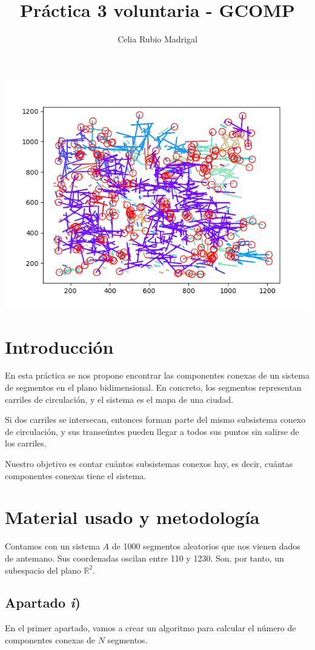 \documentclass[a4paper]{article}
\author{Celia Rubio Madrigal}
\title{Práctica 3 voluntaria - GCOMP}
\begin{document}
	\maketitle
	
	\tableofcontents
	
	\vfill
	
	\begin{center}
		\includegraphics[width=0.7\linewidth]{3}
	\end{center}
	
	
	\vfill
	\newpage
	
	\section{Introducción}
	En esta práctica se nos propone encontrar las componentes conexas de un sistema de segmentos en el plano bidimensional. En concreto, los segmentos representan carriles de circulación, y el sistema es el mapa de una ciudad. 
	
	Si dos carriles se intersecan, entonces forman parte del mismo subsistema conexo de circulación, y sus transeúntes pueden llegar a todos sus puntos sin salirse de los carriles.
	
	Nuestro objetivo es contar cuántos subsistemas conexos hay, es decir, cuántas componentes conexas tiene el sistema.	
	
	\section{Material usado y metodología}
	Contamos con un sistema $A$ de 1000 segmentos aleatorios que nos vienen dados de antemano. Sus coordenadas oscilan entre 110 y 1230. Son, por tanto, un subespacio del plano $\mathbb{R}^2$.
	
	\subsection{Apartado \textit{i})}
	En el primer apartado, vamos a crear un algoritmo para calcular el número de componentes conexas de $N$ segmentos.
	
\end{document}
